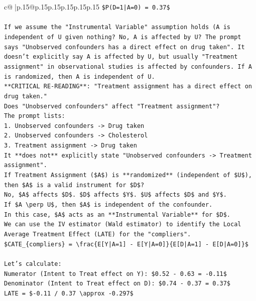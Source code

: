 \documentclass{article}
\begin{document}
{\begin{supertabular}{c@{$\;$}|p{.15\linewidth}@{}p{.15\linewidth}p{.15\linewidth}p{.15\linewidth}p{.15\linewidth}p{.15\linewidth}}
{{{\texttt{\$P(D=1|A=0) = 0.37\$} \\
\\ 
\texttt{If we assume the "Instrumental Variable" assumption holds (A is independent of U given nothing? No, A is affected by U? The prompt says "Unobserved confounders has a direct effect on drug taken". It doesn't explicitly say A is affected by U, but usually "Treatment assignment" in observational studies is affected by confounders. If A is randomized, then A is independent of U.} \\
\texttt{**CRITICAL RE{-}READING**: "Treatment assignment has a direct effect on drug taken."} \\
\texttt{Does "Unobserved confounders" affect "Treatment assignment"?} \\
\texttt{The prompt lists:} \\
\texttt{1. Unobserved confounders {-}> Drug taken} \\
\texttt{2. Unobserved confounders {-}> Cholesterol} \\
\texttt{3. Treatment assignment {-}> Drug taken} \\
\texttt{It **does not** explicitly state "Unobserved confounders {-}> Treatment assignment".} \\
\texttt{If Treatment Assignment (\$A\$) is **randomized** (independent of \$U\$), then \$A\$ is a valid instrument for \$D\$?} \\
\texttt{No, \$A\$ affects \$D\$. \$D\$ affects \$Y\$. \$U\$ affects \$D\$ and \$Y\$.} \\
\texttt{If \$A \textbackslash{}perp U\$, then \$A\$ is independent of the confounder.} \\
\texttt{In this case, \$A\$ acts as an **Instrumental Variable** for \$D\$.} \\
\texttt{We can use the IV estimator (Wald estimator) to identify the Local Average Treatment Effect (LATE) for the "compliers".} \\
\texttt{\$CATE\_\{compliers\} = \textbackslash{}frac\{E{[}Y|A=1{]} {-} E{[}Y|A=0{]}\}\{E{[}D|A=1{]} {-} E{[}D|A=0{]}\}\$} \\
\\ 
\texttt{Let's calculate:} \\
\texttt{Numerator (Intent to Treat effect on Y): \$0.52 {-} 0.63 = {-}0.11\$} \\
\texttt{Denominator (Intent to Treat effect on D): \$0.74 {-} 0.37 = 0.37\$} \\
\texttt{LATE = \${-}0.11 / 0.37 \textbackslash{}approx {-}0.297\$} \\
}}}
\end{supertabular}}
\end{document}

